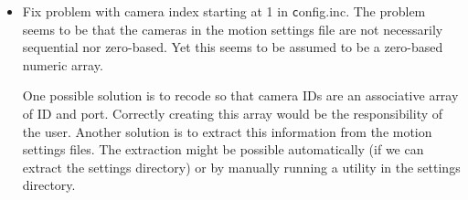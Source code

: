 \documentclass[12pt]{scrartcl} %
\begin{document}
\begin{itemize}
		\item 	Fix problem with camera index starting at 1 in {\texttt config.inc}. The problem seems to be that the cameras in the motion settings file are not necessarily sequential nor zero-based. Yet this seems to be assumed to be a zero-based numeric array.
		
         One possible solution is to recode so that camera IDs are an associative array of ID and port. Correctly creating this array would be the responsibility of the user. Another solution is to extract this information from the motion settings files. The extraction might be possible automatically (if we can extract the settings directory) or by manually running a utility in the settings directory.

	\end{itemize}
\end{document}
